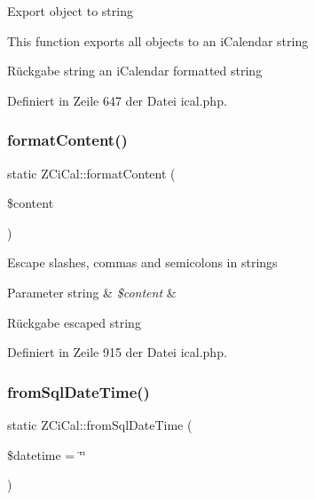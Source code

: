 Export object to string

This function exports all objects to an i\+Calendar string

\begin{DoxyReturn}{Rückgabe}
string an i\+Calendar formatted string 
\end{DoxyReturn}


Definiert in Zeile 647 der Datei ical.\+php.

\mbox{\label{class_z_ci_cal_acfd0acd8b506d8646a053d14b57bf35b}} 
\subsubsection{\texorpdfstring{format\+Content()}{formatContent()}}
{\footnotesize\ttfamily static Z\+Ci\+Cal\+::format\+Content (\begin{DoxyParamCaption}\item[{}]{\$content }\end{DoxyParamCaption})\hspace{0.3cm}{\ttfamily [static]}}

Escape slashes, commas and semicolons in strings


\begin{DoxyParams}[1]{Parameter}
string & {\em \$content} & \\
\hline
\end{DoxyParams}
\begin{DoxyReturn}{Rückgabe}
escaped string 
\end{DoxyReturn}


Definiert in Zeile 915 der Datei ical.\+php.

\mbox{\label{class_z_ci_cal_ad6053090c0bb9c5edc832790b33bee33}} 
\subsubsection{\texorpdfstring{from\+Sql\+Date\+Time()}{fromSqlDateTime()}}
{\footnotesize\ttfamily static Z\+Ci\+Cal\+::from\+Sql\+Date\+Time (\begin{DoxyParamCaption}\item[{}]{\$datetime = {\ttfamily \char`\"{}\char`\"{}} }\end{DoxyParamCaption})\hspace{0.3cm}{\ttfamily [static]}}

